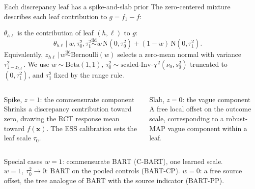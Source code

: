 \documentclass[11pt,aspectratio=169]{beamer}
\newcommand{\Normal}{\mathrm{N}}
\newcommand{\bx}{\bm{x}}
\newcommand{\given}{\,\vert\,}
\newcommand{\Ber}{\mathrm{Bernoulli}}
\begin{document}
\begin{frame}{Each discrepancy leaf has a spike-and-slab prior}
  \footnotesize
  The zero-centered mixture describes each leaf contribution to $g=f_1-f$:\par\vspace{-0.5em}
  $\theta_{h\ell}$ is the contribution of leaf $(h,\ell)$ to $g$:
  \[
    \theta_{h\ell}\given w,\tau_0^2,\tau_1^2
    \stackrel{\mathrm{iid}}{\sim} w\,\Normal(0,\tau_0^2)+(1-w)\,\Normal(0,\tau_1^2).
  \]
  Equivalently, $z_{h\ell}\given w\stackrel{\mathrm{iid}}{\sim}\Ber(w)$ selects a zero-mean normal with variance $\tau_{1-z_{h\ell}}^2$. We use $w\sim\mathrm{Beta}(1,1)$, $\tau_0^2\sim\text{scaled-Inv-}\chi^2(\nu_0,s_0^2)$ truncated to $(0,\tau_1^2)$, and $\tau_1^2$ fixed by the range rule.
  \begin{columns}[T,onlytextwidth]
      \begin{block}{Spike, $z=1$: the commensurate component}
        Shrinks a discrepancy contribution toward zero, drawing the RCT response mean toward $f(\bx)$. The ESS calibration sets the leaf scale $\tau_0$.
      \end{block}
      \begin{block}{Slab, $z=0$: the vague component}
        A free local offset on the outcome scale, corresponding to a robust-MAP vague component within a leaf.
      \end{block}
  \end{columns}
  \vspace{0.3em}
  \begin{block}{Special cases}
    $w=1$: commensurate BART (C-BART), one learned scale. \quad $w=1,\ \tau_0^2\to0$: BART on the pooled controls (BART-CP). \quad $w=0$: a free source offset, the tree analogue of BART with the source indicator (BART-PP).
  \end{block}
\end{frame}
\end{document}
